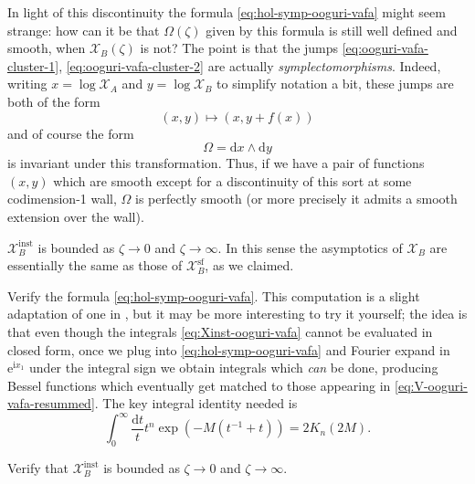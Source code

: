\documentclass[12pt,letterpaper,reqno]{article}
\numberwithin{equation}{section}
\newcommand{\cX}{\ensuremath{\mathcal X}}
\newcommand{\I}{{\mathrm i}}
\newcommand{\e}{{\mathrm e}}
\newcommand{\de}{\mathrm{d}}
\renewcommand{\sf}{\mathrm{sf}}
\newcommand{\inst}{\mathrm{inst}}
\newcommand{\ti}[1]{\textit{#1}}
\begin{document}
\begin{example}
In light of this discontinuity the formula  \eqref{eq:hol-symp-ooguri-vafa}
might seem strange: how can it be that $\Omega(\zeta)$ given by this
formula is still well defined and smooth, when $\cX_B(\zeta)$ is not?
The point is that the jumps \eqref{eq:ooguri-vafa-cluster-1},
\eqref{eq:ooguri-vafa-cluster-2} are actually \ti{symplectomorphisms}.
Indeed, writing $x = \log \cX_A$ and $y = \log \cX_B$ to
simplify notation a bit, these jumps are both of the form
\begin{equation}
  (x,y) \mapsto (x,y + f(x))
\end{equation}
and of course the form
\begin{equation}
  \Omega = \de x \wedge \de y
\end{equation}
is invariant under this transformation. Thus, if we have a pair
of functions $(x,y)$ which are smooth except for
a discontinuity of this sort at some codimension-1 wall,
$\Omega$ is perfectly smooth (or more precisely it admits a
smooth extension over the wall).

$\cX_B^\inst$ is bounded as $\zeta \to 0$ and $\zeta \to \infty$.
In this sense the asymptotics of $\cX_B$ are essentially the
same as those of $\cX_B^\sf$, as we claimed.

\end{example}

\begin{exercise} \label{exc:ov-check-symplectic}
Verify the formula \eqref{eq:hol-symp-ooguri-vafa}.
This computation is a slight adaptation of one in
\cite{Gaiotto:2008cd}, but it may be more interesting to try
it yourself; the idea is that even though the integrals
\eqref{eq:Xinst-ooguri-vafa} cannot
be evaluated in closed form, once we plug into \eqref{eq:hol-symp-ooguri-vafa}
and Fourier expand in $\e^{\I x_1}$ under the integral sign
we obtain integrals which \ti{can} be done,
producing Bessel functions which eventually get matched to those appearing
in \eqref{eq:V-ooguri-vafa-resummed}.
The key integral identity needed is
\begin{equation} \label{eq:bessel-integral-identity}
 \int_{0}^\infty \frac{\de t}{t} t^n \exp \left( -M (t^{-1} + t) \right) = 2 K_{n}(2 M).
\end{equation}

\end{exercise}

\begin{exercise} Verify that $\cX_B^\inst$ is bounded as $\zeta \to 0$ and $\zeta \to \infty$.
\end{exercise}
\end{document}
